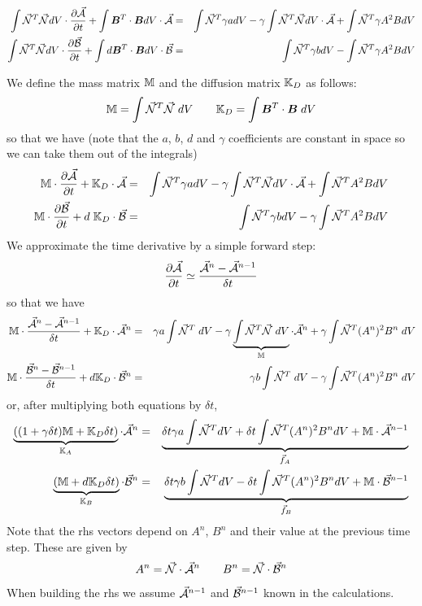\begin{eqnarray}
\int \vec{{\mathcal{N}}}^T \vec{{\mathcal{N}}} dV \cdot \frac{\partial \vec{\cal A}}{\partial t} + 
\int {\bm B}^T \cdot {\bm B} dV \cdot \vec{\cal A} 
&=& \int \vec{{\mathcal{N}}}^T \gamma a dV 
- \gamma\int \vec{{\mathcal{N}}}^T \vec{{\mathcal{N}}} dV \cdot \vec{\cal A}
+ \int \vec{{\mathcal{N}}}^T \gamma A^2 B dV \nonumber\\ 
\int \vec{{\mathcal{N}}}^T \vec{{\mathcal{N}}} dV \cdot \frac{\partial \vec{\cal B}}{\partial t} + 
\int d {\bm B}^T \cdot {\bm B} dV \cdot \vec{\cal B} 
&=& \int \vec{{\mathcal{N}}}^T \gamma b dV 
- \int \vec{{\mathcal{N}}}^T \gamma A^2 B dV 
\end{eqnarray}

We define the mass matrix ${\mathbb{M}}$ and the diffusion matrix ${\mathbb{K}}_D$ as follows:
\[
{{\mathbb{M}}} = 
\int \vec{{\mathcal{N}}}^T \vec{{\mathcal{N}}} \; dV 
\qquad
{\mathbb{K}}_D = 
\int {\bm B}^T \cdot {\bm B} \; dV  
\]
so that we have (note that  the $a$, $b$, $d$ and $\gamma$ coefficients are
constant in space so we can take them out of the integrals)
\begin{eqnarray}
{{\mathbb{M}}} \cdot  \frac{\partial \vec{\cal A}}{\partial t} + 
{\mathbb{K}}_D \cdot \vec{\cal A} 
&=& \int \vec{{\mathcal{N}}}^T \gamma a dV 
- \gamma \int \vec{{\mathcal{N}}}^T \vec{{\mathcal{N}}} dV \cdot \vec{\cal A}
+ \int \vec{{\mathcal{N}}}^T A^2 B dV  \nonumber\\
{{\mathbb{M}}} \cdot  \frac{\partial \vec{\cal B}}{\partial t} + 
d\; {\mathbb{K}}_D \cdot \vec{\cal B} 
&=& \int \vec{{\mathcal{N}}}^T \gamma b dV 
- \gamma \int \vec{{\mathcal{N}}}^T A^2 B dV 
\end{eqnarray}
We approximate the time derivative by a simple forward step:
\[
\frac{\partial \vec{\cal A}}{\partial t}  \simeq
\frac{ \vec{\cal A}^n - \vec{\cal A}^{n-1}  }{\delta t} 
\]
so that we have
\begin{eqnarray}
{{\mathbb{M}}} \cdot \frac{ \vec{\cal A}^n - \vec{\cal A}^{n-1}  }{\delta t}  +
{\mathbb{K}}_D \cdot \vec{\cal A}^n 
&=& \gamma a\int \vec{{\mathcal{N}}}^T \;  dV 
- \gamma \underbrace{\int \vec{{\mathcal{N}}}^T \vec{{\mathcal{N}}} \; dV}_{{\mathbb{M}}} \cdot \vec{\cal A}^n
+ \gamma \int \vec{{\mathcal{N}}}^T (A^n)^2 B^n \; dV  \nonumber\\
{{\mathbb{M}}} \cdot \frac{ \vec{\cal B}^n - \vec{\cal B}^{n-1}  }{\delta t}  +
d {\mathbb{K}}_D \cdot \vec{\cal B}^n 
&=& \gamma b\int \vec{{\mathcal{N}}}^T \; dV 
- \gamma \int \vec{{\mathcal{N}}}^T (A^n)^2 B^n \; dV 
\end{eqnarray}
or, after multiplying both equations by $\delta t$,
\begin{eqnarray}
\underbrace{
((1+\gamma \delta t) {{\mathbb{M}}} + {\mathbb{K}}_D  \delta t )}_{{\mathbb{K}}_A} \cdot \vec{\cal A}^n 
&=& 
\underbrace{\delta t \gamma a \int \vec{{\mathcal{N}}}^T  dV 
+ \delta t\int \vec{{\mathcal{N}}}^T (A^n)^2 B^n dV  
+ {{\mathbb{M}}} \cdot \vec{\cal A}^{n-1}}_{\vec{f}_A}
\nonumber\\
\underbrace{({\mathbb{M}} + d {\mathbb{K}}_D \delta t)}_{{\mathbb{K}}_B} \cdot \vec{\cal B}^n 
&=& 
\underbrace{
\delta t \gamma b \int \vec{{\mathcal{N}}}^T dV 
- \delta t\int \vec{{\mathcal{N}}}^T (A^n)^2 B^n dV 
+ {{\mathbb{M}}} \cdot \vec{\cal B}^{n-1}}_{\vec{f}_B}
\end{eqnarray}
Note that the rhs vectors depend on $A^n$, $B^n$ and their value at the previous time step.
These are given by 
\[
A^n = \vec{\cal N}\cdot \vec{\cal A}^n
\qquad 
B^n = \vec{\cal N}\cdot \vec{\cal B}^n
\]
When building the rhs we assume $\vec{\cal A}^{n-1}$ and $\vec{\cal B}^{n-1}$ known in the calculations. 

